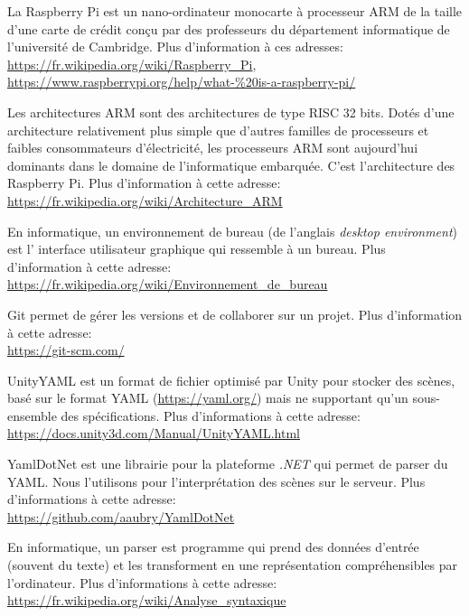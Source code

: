 \documentclass[a4paper]{article}
\begin{document}
\begin{thebibliography}{}
	La Raspberry Pi est un nano-ordinateur monocarte à processeur ARM de la taille d'une carte de crédit conçu par des professeurs du 	  département informatique de l'université de Cambridge.
    Plus d'information à ces adresses: \\ 
    \url{https://fr.wikipedia.org/wiki/Raspberry_Pi}, \\
    \url{https://www.raspberrypi.org/help/what-\%20is-a-raspberry-pi/}
    
      Les architectures ARM sont des architectures de type RISC 32 bits. Dotés d'une architecture relativement plus simple que d'autres familles de processeurs et faibles consommateurs d'électricité, les processeurs ARM sont aujourd'hui dominants dans le domaine de l'informatique embarquée. C'est l'architecture des Raspberry Pi.
      Plus d'information à cette adresse:\\
      \url{https://fr.wikipedia.org/wiki/Architecture_ARM}
      
 	En informatique, un environnement de bureau (de l'anglais \textit{desktop environment}) est l' interface utilisateur graphique qui ressemble à un bureau. 
    Plus d'information à cette adresse: \\
    \url{https://fr.wikipedia.org/wiki/Environnement_de_bureau}

    Git permet de gérer les versions et de collaborer sur un projet. Plus d'information à cette adresse: \\
    \url{https://git-scm.com/}

    UnityYAML est un format de fichier optimisé par Unity pour stocker des scènes, basé sur le format YAML (\url{https://yaml.org/}) mais ne supportant qu'un sous-ensemble des spécifications. Plus d'informations à cette adresse: \\
    \url{https://docs.unity3d.com/Manual/UnityYAML.html}
    
    YamlDotNet est une librairie pour la plateforme \textit{.NET} qui permet de parser du YAML. Nous l'utilisons pour l'interprétation des scènes sur le serveur. Plus d'informations à cette adresse: \\
    \url{https://github.com/aaubry/YamlDotNet}
    
	En informatique, un parser est programme qui prend des données d'entrée (souvent du texte) et les transforment en une représentation compréhensibles par l'ordinateur. Plus d'informations à cette adresse: \\
    \url{https://fr.wikipedia.org/wiki/Analyse_syntaxique}
    

\end{thebibliography}
\end{document}

